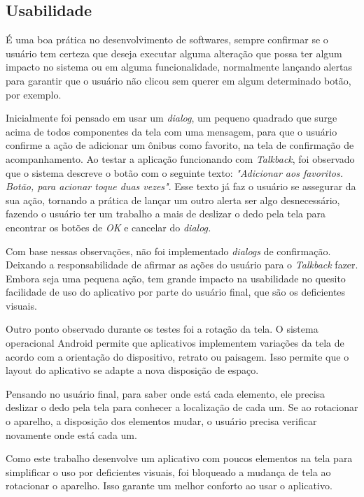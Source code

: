 \documentclass[
	12pt,				%
	oneside,			%
	a4paper,			%
	brazil				%
]{abntex2}
\begin{document}
{\subsection{Usabilidade}

É uma boa prática no desenvolvimento de softwares, sempre confirmar se o usuário tem certeza que deseja executar alguma alteração que possa ter algum impacto no sistema ou em alguma funcionalidade, normalmente lançando alertas para garantir que o usuário não clicou sem querer em algum determinado botão, por exemplo. 

Inicialmente foi pensado em usar um \textit{dialog}, um pequeno quadrado que surge acima de todos componentes da tela com uma mensagem, para que o usuário confirme a ação de adicionar um ônibus como favorito, na tela de confirmação de acompanhamento. Ao testar a aplicação funcionando com \textit{Talkback}, foi observado que o sistema descreve o botão com o seguinte texto: \textit{"Adicionar aos favoritos. Botão, para acionar toque duas vezes"}. Esse texto já faz o usuário se assegurar da sua ação, tornando a prática de lançar um outro alerta ser algo desnecessário, fazendo o usuário ter um trabalho a mais de deslizar o dedo pela tela para encontrar os botões de \textit{OK} e cancelar do \textit{dialog.}

Com base nessas observações, não foi implementado \textit{dialogs} de confirmação. Deixando a responsabilidade de afirmar as ações do usuário para o \textit{Talkback} fazer. Embora seja uma pequena ação, tem grande impacto na usabilidade no quesito facilidade de uso do aplicativo por parte do usuário final, que são os deficientes visuais.

Outro ponto observado durante os testes foi a rotação da tela. O sistema operacional Android permite que aplicativos implementem variações da tela de acordo com a orientação do dispositivo, retrato ou paisagem. Isso permite que o layout do aplicativo se adapte a nova disposição de espaço.

Pensando no usuário final, para saber onde está cada elemento, ele precisa deslizar o dedo pela tela para conhecer a localização de cada um. Se ao rotacionar o aparelho, a disposição dos elementos mudar, o usuário precisa verificar novamente onde está cada um.

Como este trabalho desenvolve um aplicativo com poucos elementos na tela para simplificar o uso por deficientes visuais, foi bloqueado a mudança de tela ao rotacionar o aparelho. Isso garante um melhor conforto ao usar o aplicativo.


}
\end{document}
